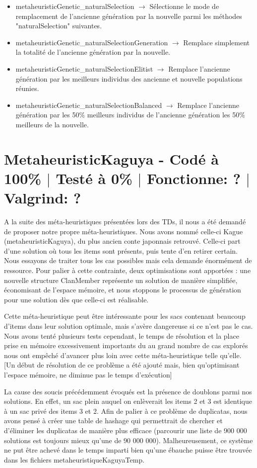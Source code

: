 \documentclass{EPUProjetPeiP}
\newcommand{\comp}[5]{
	\section[#1]{#1 {\small - Codé à #2\% $\vert$ Testé à #3\% $\vert$ Fonctionne: #4 $\vert$ Valgrind: #5}}
}
\begin{document}
\begin{itemize}
	\item metaheuristicGenetic\_naturalSelection $\longrightarrow$ Sélectionne le mode de remplacement de l'ancienne génération par la nouvelle parmi les méthodes "naturalSelection" suivantes.
	\item metaheuristicGenetic\_naturalSelectionGeneration $\longrightarrow$ Remplace simplement la totalité de l'ancienne génération par la nouvelle.
	\item metaheuristicGenetic\_naturalSelectionElitist $\longrightarrow$ Remplace l'ancienne génération par les meilleurs individus des ancienne et nouvelle populations réunies.
	\item metaheuristicGenetic\_naturalSelectionBalanced $\longrightarrow$ Remplace l'ancienne génération par les 50\% meilleurs individus de l'ancienne génération les 50\% meilleurs de la nouvelle.
\end{itemize}

\comp{MetaheuristicKaguya}{100}{0}{?}{?}
A la suite des méta-heuristiques présentées lors des TDs, il nous a été demandé de proposer notre propre méta-heuristiques. Nous avons nommé celle-ci Kague (metaheuristicKaguya), du plus ancien conte japonnais retrouvé. Celle-ci part d'une solution où tous les items sont présents, puis tente d'en retirer certain.
Nous essayons de traiter tous les cas possibles mais cela demande énormément de ressource. Pour palier à cette contrainte, deux optimisations sont apportées : une nouvelle structure ClanMember représente un solution de manière simplifiée, économisant de l'espace mémoire, et nous stoppons le processus de génération pour une solution dès que celle-ci est réalisable.

Cette méta-heuristique peut être intéressante pour les sacs contenant beaucoup d'items dans leur solution optimale, mais s'avère dangereuse si ce n'est pas le cas. Nous avons tenté plusieurs tests cependant, le temps de résolution et la place prise en mémoire excessivement importants du au grand nombre de cas explorés nous ont empêché d'avancer plus loin avec cette méta-heuristique telle qu'elle. [Un début de résolution de ce problème a été ajouté mais, bien qu'optimisant l'espace mémoire, ne diminue pas le temps d'exécution]

La cause des soucis précédemment évoqués est la présence de doublons parmi nos solutions. En effet, un sac plein auquel on enlèverait les items 2 et 3 est identique à un sac privé des items 3 et 2. Afin de palier à ce problème de duplicatas, nous avons pensé à créer une table de hashage qui permettrait de chercher et d'éliminer les duplicatas de manière plus efficace (parcourir une liste de 900 000 solutions est toujours mieux qu'une de 90 000 000). Malheureusement, ce système ne put être achevé dans le temps imparti bien qu'une ébauche puisse être trouvée dans les fichiers metaheuristiqueKaguyaTemp.
\end{document}
